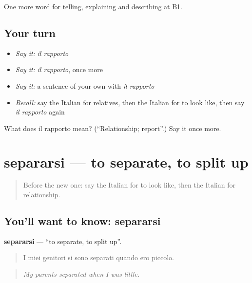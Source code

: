 \begin{grammarlens}[title={What you've built}]
One more word for telling, explaining and describing at B1.
\end{grammarlens}

\subsection*{Your turn}
\begin{itemize}
\raggedright
  \item \emph{Say it:} \emph{il rapporto}
  \item \emph{Say it:} \emph{il rapporto}, once more
  \item \emph{Say it:} a sentence of your own with \emph{il rapporto}
  \item \emph{Recall:} say the Italian for relatives, then the Italian for to look like, then say \emph{il rapporto} again
\end{itemize}

\begin{tcolorbox}[breakable,colback=teal!4,colframe=teal!35!black,title={Before you move on}]
What does il rapporto mean? (\textquotedblleft{}Relationship; report\textquotedblright{}.) Say it once more.
\end{tcolorbox}
\section[separarsi]{separarsi — to separate, to split up}

\label{lesson:IT-C494-separarsi}



\begin{quote}
Before the new one: say the Italian for to look like, then the Italian for relationship.
\end{quote}

\subsection*{You'll want to know: separarsi}
\textbf{separarsi} — \textquotedblleft{}to separate, to split up\textquotedblright{}.

\begin{quote}
I miei genitori si sono separati quando ero piccolo.
\end{quote}

\begin{quote}
\emph{My parents separated when I was little.}
\end{quote}

